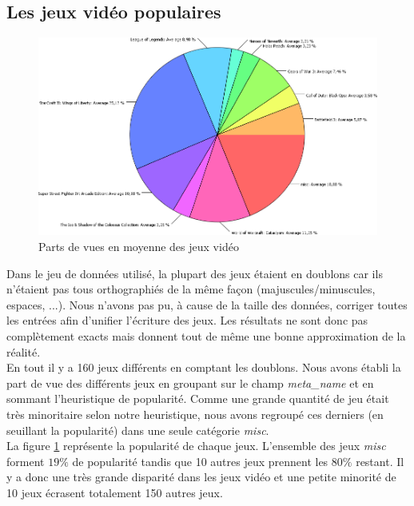 \documentclass[11pt, a4paper, titlepage]{scrartcl}
\begin{document}
\subsection{Les jeux vidéo populaires}
\begin{figure}[h]
    \centering
    \includegraphics[scale=0.4]{images/main_games}
    \caption{\label{fig:main_games} Parts de vues en moyenne des jeux vidéo}
\end{figure}

Dans le jeu de données utilisé, la plupart des jeux étaient en doublons car ils
n'étaient pas tous orthographiés de la même façon (majuscules/minuscules,
espaces, ...). Nous n'avons pas pu, à cause de la taille des données, corriger
toutes les entrées afin d'unifier l'écriture des jeux. Les résultats ne sont
donc pas complètement exacts mais donnent tout de même une bonne approximation
de la réalité. \\

En tout il y a 160 jeux différents en comptant les doublons. Nous avons établi
la part de vue des différents jeux en groupant sur le champ \textit{meta\_name}
et en sommant l'heuristique de popularité. Comme une grande quantité de jeu
était très minoritaire selon notre heuristique, nous avons regroupé ces
derniers (en seuillant la popularité) dans une seule catégorie \textit{misc}. \\

La figure \ref{fig:main_games} représente la popularité de chaque jeux.
L'ensemble des jeux \textit{misc} forment $19\%$ de popularité tandis que 10
autres jeux prennent les $80\%$ restant. Il y a donc une très grande disparité
dans les jeux vidéo et une petite minorité de 10 jeux écrasent totalement 150
autres jeux.
\end{document}
